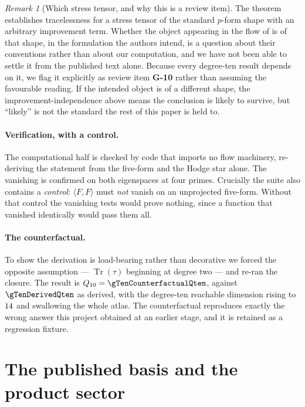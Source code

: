 \documentclass[11pt,a4paper]{article}
\theoremstyle{definition}
\theoremstyle{remark}
\newtheorem{remark}[theorem]{Remark}
\newcommand{\Qten}{Q_{10}}
\begin{document}
\begin{remark}[Which stress tensor, and why this is a review item]
The theorem establishes tracelessness for a stress tensor of the standard
$p$-form shape with an arbitrary improvement term. Whether the object appearing
in the flow of \cite{Hutomo:2025chiral} is of that shape, in the formulation the
authors intend, is a question about their conventions rather than about our
computation, and we have not been able to settle it from the published text
alone. Because every degree-ten result depends on it, we flag it explicitly as
review item \textbf{G-10} rather than assuming the favourable reading. If the
intended object is of a different shape, the improvement-independence above means
the conclusion is likely to survive, but ``likely'' is not the standard the rest
of this paper is held to.
\end{remark}

\paragraph{Verification, with a control.}
The computational half is checked by code that imports no flow machinery,
re-deriving the statement from the five-form and the Hodge star alone. The
vanishing is confirmed on both eigenspaces at four primes. Crucially the suite
also contains a \emph{control}: $\langle F,F\rangle$ must \emph{not} vanish on an
unprojected five-form. Without that control the vanishing tests would prove
nothing, since a function that vanished identically would pass them all.

\paragraph{The counterfactual.}
To show the derivation is load-bearing rather than decorative we forced the
opposite assumption --- $\operatorname{Tr}(\tau)$ beginning at degree two --- and
re-ran the closure. The result is $\Qten = \gTenCounterfactualQten$, against
$\gTenDerivedQten$ as derived, with the degree-ten reachable dimension rising to
$14$ and swallowing the whole atlas. The counterfactual reproduces exactly
the wrong answer this project obtained at an earlier stage, and it is retained as
a regression fixture.



\section{The published basis and the product sector}
\label{sec:published}
\end{document}
